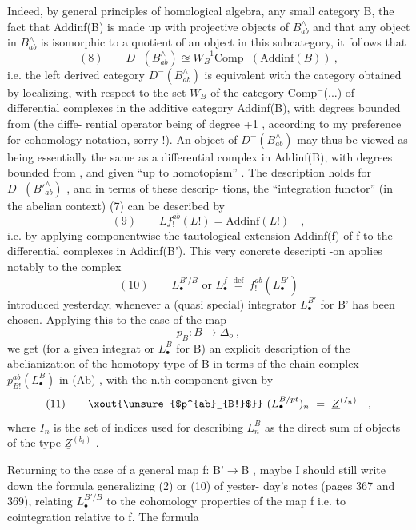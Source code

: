 
Indeed, by general principles of homological algebra,  any small
category B,  the fact that Addinf(B) is made up with projective
objects of $B^{\wedge}_{ab}$ and that any object in $B^{\wedge}_{ab}$ is isomorphic to a quotient of
an object in this subcategory, it follows that
\[ (8) \qquad D^{-}(B^{\wedge}_{ab}) \approxeq W_{B}^{-1}\mathrm{Comp}^{-}(\mathrm{Addinf}(B)) \ , \]
i.e. the left derived category $D^{-}(B^{\wedge}_{ab})$ is equivalent with the category
obtained by localizing, with respect to the set $W_{B}$ of 
\margin{)}
the category  Comp$^{-}$(...) of  differential complexes in the
additive category Addinf(B), with degrees bounded from  (the diffe-%
rential operator being of degree +1 , according to my preference for
cohomology notation, sorry !). An object of $D^{-}(B^{\wedge}_{ab})$ may thus be viewed
as being essentially the same as  a differential complex in Addinf(B),
with degrees bounded from , and given ``up to homotopism'' . The
 description holds for $D^{-}(B'^{\wedge}_{ab})$ , and in terms of these descrip-%
tions, the ``integration functor'' (in the abelian context) (7) can be
described by
\[ (9) \qquad Lf^{ab}_{!}(L!) = \mathrm{Addinf}(L!) \quad , \]
i.e. by applying componentwise the tautological extension Addinf(f) of f
to the differential complexes in Addinf(B'). This very concrete descripti
-on applies notably to the complex
\[ (10) \qquad L_{\bullet}^{B'/B} \text{ or } L_{\bullet}^{f} \ \overset{\mathrm{def}}{=}\ f^{ab}_{!}(L_{\bullet}^{B'}) \]
introduced yesterday, whenever a (quasi special) integrator $L_{\bullet}^{B'}$ for B'
has been chosen. Applying this to the case of the map
\[ p_{B} : B \longrightarrow \Delta_{o} \ , \]
we get  (for a given integrat or $L_{\bullet}^{B}$ for B) an explicit description of
the abelianization of the homotopy type of B  in terms of the
chain complex $p^{ab}_{B!}(L_{\bullet}^{B})$ in (Ab) , with the n.th component given by
\[ (11) \qquad \xout{\unsure{$p^{ab}_{B!}$}} \ (L_{\bullet}^{B/pt})_{n} \ = \ \underline{Z}^{(I_{n})} \quad , \]
where $I_{n}$ is the set of indices used for describing $L_{n}^{B}$ as the direct
sum of objects of the type $\underline{Z}^{(b_{i})}$ .

Returning to the case of a general  map f: B'$\rightarrow$B , maybe I
should still write down the formula generalizing (2) or (10) of yester-%
day's notes (pages 367 and 369), relating $L_{\bullet}^{B'/B}$ to the cohomology
properties of the map f i.e. to cointegration relative to f. The formula

